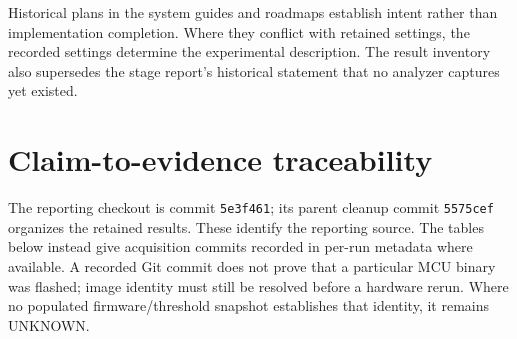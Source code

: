 \documentclass[a4paper,11pt]{article}
\newcommand{\page}{\clearpage}
\begin{document}
Historical plans in the system guides and roadmaps establish intent rather than implementation completion. Where they conflict with retained settings, the recorded settings determine the experimental description. The result inventory also supersedes the stage report's historical statement that no analyzer captures yet existed.
\page
\appendix
\section{Claim-to-evidence traceability}
The reporting checkout is commit \texttt{5e3f461}; its parent cleanup commit \texttt{5575cef} organizes the retained results. These identify the reporting source. The tables below instead give acquisition commits recorded in per-run metadata where available. A recorded Git commit does not prove that a particular MCU binary was flashed; image identity must still be resolved before a hardware rerun. Where no populated firmware/threshold snapshot establishes that identity, it remains UNKNOWN.
\end{document}
